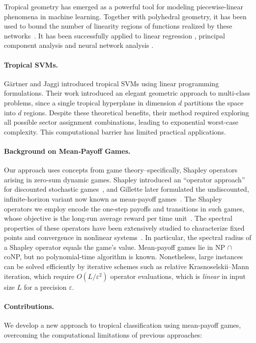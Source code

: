 \documentclass{article}
\begin{document}
Tropical geometry has emerged as a powerful tool for modeling piecewise-linear phenomena in machine learning. Together with polyhedral geometry,
it has been used to bound the number of linearity regions of functions realized by these networks~\cite{zhang2018,montufar}.
It has been successfully applied to linear regression \cite{maragos2020,akiangaubertqisaadi}, principal component analysis \cite{yoshida2019} and neural network analysis \cite{maragos2021}.

\paragraph{Tropical SVMs.} Gärtner and Jaggi \cite{gartner2008} introduced tropical SVMs using linear programming formulations. Their work introduced an elegant geometric approach to multi-class problems, since a single tropical hyperplane in dimension $d$ partitions the space into $d$ regions.
Despite these theoretical benefits, their method required exploring all possible sector assignment combinations, leading to exponential worst-case complexity. This computational barrier has limited practical applications.

\paragraph{Background on Mean‐Payoff Games.}
Our approach uses concepts from game theory--specifically, Shapley operators arising in zero-sum dynamic games.
Shapley introduced an ``operator approach'' for discounted stochastic games~\cite{shapley1953}, and Gillette later formulated the undiscounted, infinite-horizon variant now known as mean-payoff games~\cite{gillette1957}.
The Shapley operators we employ encode the one-step payoffs and transitions in such games, whose objective is the long-run average reward per time unit~\cite{zwick1996}. 
The spectral properties of these operators have been extensively studied to characterize fixed points and convergence in nonlinear systems~\cite{kolokoltsov1997,gaubert2004}.
In particular, the spectral radius of a Shapley operator equals the game's value.
Mean-payoff games lie in NP $\cap$ coNP, but no polynomial-time algorithm is known.
Nonetheless, large instances can be solved efficiently by iterative schemes such as relative Krasnoselskii--Mann iteration, which require $O(L/\varepsilon^2)$ operator evaluations, which is \emph{linear} in input size $L$ for a precision $\varepsilon$.

\paragraph{Contributions.} We develop a new approach to tropical classification using mean-payoff games,
overcoming the computational limitations of previous approaches:
\end{document}
